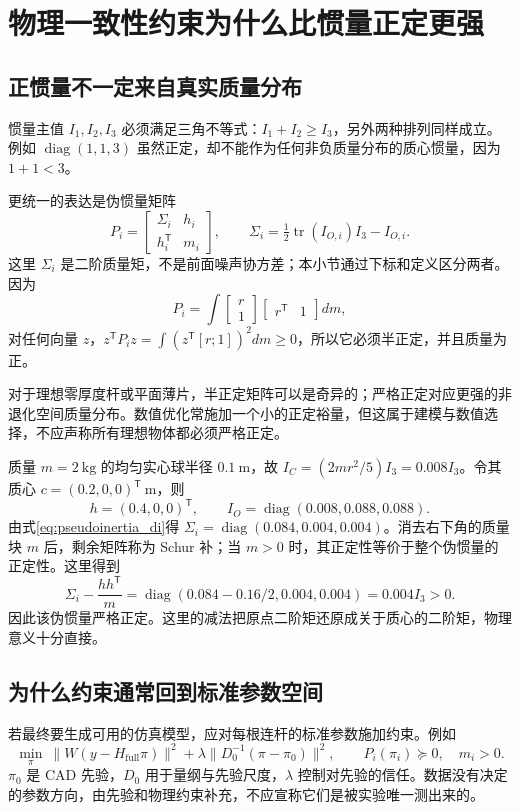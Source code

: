 \section{物理一致性约束为什么比惯量正定更强}
\subsection{正惯量不一定来自真实质量分布}
惯量主值 $I_1,I_2,I_3$ 必须满足三角不等式：$I_1+I_2\ge I_3$，另外两种排列同样成立。例如 $\operatorname{diag}(1,1,3)$ 虽然正定，却不能作为任何非负质量分布的质心惯量，因为 $1+1<3$。

更统一的表达是伪惯量矩阵
\begin{equation}\label{eq:pseudoinertia_di}
 P_i=\begin{bmatrix}\Sigma_i&h_i\\h_i^{\mathsf T}&m_i\end{bmatrix},\qquad
 \Sigma_i=\tfrac12\operatorname{tr}(I_{O,i})I_3-I_{O,i}.
\end{equation}
这里 $\Sigma_i$ 是二阶质量矩，不是前面噪声协方差；本小节通过下标和定义区分两者。因为
\[
 P_i=\int\begin{bmatrix}r\\1\end{bmatrix}\begin{bmatrix}r^{\mathsf T}&1\end{bmatrix}dm,
\]
对任何向量 $z$，$z^{\mathsf T}P_iz=\int(z^{\mathsf T}[r;1])^2dm\ge0$，所以它必须半正定，并且质量为正。

对于理想零厚度杆或平面薄片，半正定矩阵可以是奇异的；严格正定对应更强的非退化空间质量分布。数值优化常施加一个小的正定裕量，但这属于建模与数值选择，不应声称所有理想物体都必须严格正定。

\begin{examplebox}[算例 8C 平行轴变换后的物理一致性]
质量 $m=2\ \mathrm{kg}$ 的均匀实心球半径 $0.1\ \mathrm m$，故 $I_C=(2mr^2/5)I_3=0.008I_3$。令其质心 $c=(0.2,0,0)^{\mathsf T}\ \mathrm m$，则
\[
 h=(0.4,0,0)^{\mathsf T},\qquad I_O=\operatorname{diag}(0.008,0.088,0.088).
\]
由式\eqref{eq:pseudoinertia_di}得 $\Sigma_i=\operatorname{diag}(0.084,0.004,0.004)$。消去右下角的质量块 $m$ 后，剩余矩阵称为 Schur 补；当 $m>0$ 时，其正定性等价于整个伪惯量的正定性。这里得到
\[
 \Sigma_i-\frac{hh^{\mathsf T}}m
 =\operatorname{diag}(0.084-0.16/2,0.004,0.004)=0.004I_3>0.
\]
因此该伪惯量严格正定。这里的减法把原点二阶矩还原成关于质心的二阶矩，物理意义十分直接。
\end{examplebox}

\subsection{为什么约束通常回到标准参数空间}
若最终要生成可用的仿真模型，应对每根连杆的标准参数施加约束。例如
\begin{equation}
 \min_{\pi}\ \|W(y-H_{\mathrm{full}}\pi)\|^2
 +\lambda\|D_0^{-1}(\pi-\pi_0)\|^2,\qquad P_i(\pi_i)\succeq0,\quad m_i>0.
\end{equation}
$\pi_0$ 是 CAD 先验，$D_0$ 用于量纲与先验尺度，$\lambda$ 控制对先验的信任。数据没有决定的参数方向，由先验和物理约束补充，不应宣称它们是被实验唯一测出来的。

